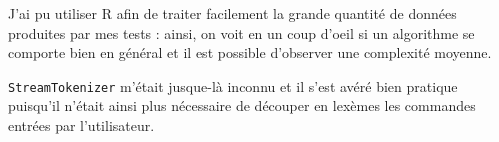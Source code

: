 \documentclass[12pt,twocolumn]{article}
\begin{document}
J'ai pu utiliser R afin de traiter facilement la grande quantité de données
produites par mes tests : ainsi, on voit en un coup d'oeil si un algorithme se
comporte bien en général et il est possible d'observer une complexité moyenne.

\texttt{StreamTokenizer} m'était jusque-là inconnu et il s'est avéré bien
pratique puisqu'il n'était ainsi plus nécessaire de découper en lexèmes
les commandes entrées par l'utilisateur.



\end{document}
